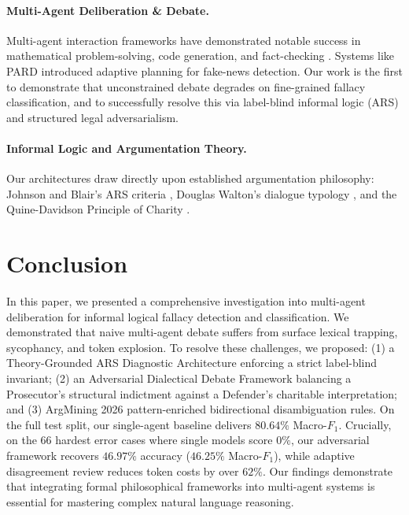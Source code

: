 \documentclass[11pt]{article}
\begin{document}
\paragraph{Multi-Agent Deliberation \& Debate.}
Multi-agent interaction frameworks have demonstrated notable success in mathematical problem-solving, code generation, and fact-checking \cite{du2023improving,liang2023encouraging,chan2023chateval}. Systems like PARD \cite{pard2026} introduced adaptive planning for fake-news detection. Our work is the first to demonstrate that unconstrained debate degrades on fine-grained fallacy classification, and to successfully resolve this via label-blind informal logic (ARS) and structured legal adversarialism.

\paragraph{Informal Logic and Argumentation Theory.}
Our architectures draw directly upon established argumentation philosophy: Johnson and Blair's ARS criteria \cite{johnsonblair1977,johnsonblair2006}, Douglas Walton's dialogue typology \cite{walton1998,walton2008}, and the Quine-Davidson Principle of Charity \cite{quine1960,davidson1973}.

\section{Conclusion}
In this paper, we presented a comprehensive investigation into multi-agent deliberation for informal logical fallacy detection and classification. We demonstrated that naive multi-agent debate suffers from surface lexical trapping, sycophancy, and token explosion. To resolve these challenges, we proposed: (1) a Theory-Grounded ARS Diagnostic Architecture enforcing a strict label-blind invariant; (2) an Adversarial Dialectical Debate Framework balancing a Prosecutor's structural indictment against a Defender's charitable interpretation; and (3) ArgMining 2026 pattern-enriched bidirectional disambiguation rules. On the full test split, our single-agent baseline delivers $80.64\%$ Macro-$F_1$. Crucially, on the 66 hardest error cases where single models score $0\%$, our adversarial framework recovers $46.97\%$ accuracy ($46.25\%$ Macro-$F_1$), while adaptive disagreement review reduces token costs by over $62\%$. Our findings demonstrate that integrating formal philosophical frameworks into multi-agent systems is essential for mastering complex natural language reasoning.
\end{document}
